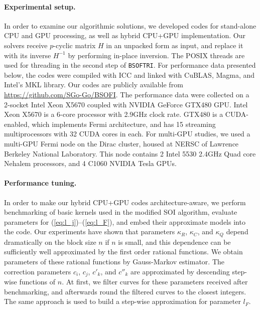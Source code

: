 \documentclass{llncs}
\newcommand{\Blas}{{\sc BLAS}\xspace}
\newcommand{\Cuda}{{\sc CUDA}\xspace}
\newcommand{\CuBlas}{{\sc Cu\Blas}\xspace}
\newcommand{\Magma}{{\sc Magma}\xspace}
\newcommand{\Bsoftri}{\texttt{BSOFTRI}\xspace}
\begin{document}
    \paragraph{Experimental setup.}
    \label{sec:experimental_setup}
    In order to examine our algorithmic solutions, 
    we developed codes for 
    stand-alone CPU and GPU processing, 
    as well as hybrid CPU+GPU implementation.
    Our solvers receive $p$-cyclic matrix $H$ in an unpacked form as input, 
    and replace it with its inverse $H^{-1}$ 
    by performing in-place inversion. 
    The POSIX threads are used for threading in the second step of \Bsoftri.
    For performance data presented below, the codes were compiled with ICC
    and linked with \CuBlas, \Magma, and Intel's MKL library.
    Our codes are publicly available from
    \url{https://github.com/SGo-Go/BSOFI}.
    The performance data were collected on a 2-socket Intel Xeon X5670 
    coupled with NVIDIA GeForce GTX480 GPU.
    Intel Xeon X5670 is a 6-core processor with 2.9GHz clock rate.
    GTX480 is a \Cuda-enabled, which implements Fermi architecture, 
    and has 15 streaming multiprocessors with 32 \Cuda cores in each.
    For multi-GPU studies, we used a multi-GPU Fermi node on the Dirac cluster,
    housed at NERSC of Lawrence Berkeley National Laboratory.
    This node contains 2 Intel 5530 2.4GHz Quad core Nehalem processors, 
    and 4 C1060 NVIDIA Tesla GPUs.

    \paragraph{Performance tuning.}
    \label{sec:BB_performance}
    In order to make our hybrid CPU+GPU codes architecture-aware, 
    we perform benchmarking of basic kernels used in the modified SOI algorithm, 
    evaluate parameters for (\ref{eq:l_j})--(\ref{eq:l_F}), 
    and embed their approximate models into the code.
    Our experiments have shown that 
    parameters $\kappa_R$, $\kappa_C$, and $\kappa_Q$ 
    depend dramatically on the block size $n$ if $n$ is small, and
    this dependence can be sufficiently well
    approximated by the first order rational functions. 
    We obtain parameters of these rational functions 
    by Gauss-Markov estimator. 
    The correction parameters $c_i$, $c_j$, $c'_k$, and $c''_k$
    are approximated by descending step-wise functions of $n$.
    At first, we filter curves for these parameters received after benchmarking, 
    and afterwards round the filtered curves to the closest integers.
    The same approach is used to build a step-wise approximation for parameter $l_F$.
\end{document}
